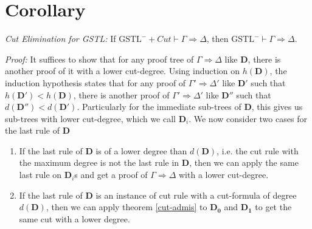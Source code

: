 \documentclass[a4paper, 12pt]{paper}
\begin{document}
\begin{itemize}
\begin{enumerate}[label=\Roman*]
\begin{itemize}
\begin{prooftree}
				\noLine
				
			\end{prooftree}
		\end{itemize}
	\end{enumerate}
\end{itemize}

\section{Corollary} \emph{Cut Elimination for GSTL: }
If $\text{GSTL}^- + Cut \vdash \Gamma \Rightarrow \Delta$, then $\text{GSTL}^- \vdash \Gamma \Rightarrow \Delta$.

\emph{Proof:} It suffices to show that for any proof tree of $\Gamma \Rightarrow \Delta$ like $\mathbf{D}$, there is another proof of it with a lower cut-degree. Using induction on $h(\mathbf{D})$, the induction hypothesis states that for any proof of $\Gamma' \Rightarrow \Delta'$ like $\mathbf{D'}$ such that $h(\mathbf{D'}) < h(\mathbf{D})$, there is another proof of $\Gamma' \Rightarrow \Delta'$ like $\mathbf{D''}$ such that $d(\mathbf{D''}) < d(\mathbf{D'})$. Particularly for the immediate sub-trees of $\mathbf{D}$, this gives us sub-trees with lower cut-degree, which we call $\mathbf{D}_i$. We now consider two cases for the last rule of $\mathbf{D}$

\begin{enumerate}[label=\Roman*]
	\item If the last rule of $\mathbf{D}$ is of a lower degree than $d(\mathbf{D})$, i.e. the cut rule with the maximum degree is not the last rule in $\mathbf{D}$, then we can apply the same last rule on $\mathbf{D}_i$s and get a proof of $\Gamma \Rightarrow \Delta$ with a lower cut-degree.
	
	\item If the last rule of $\mathbf{D}$ is an instance of cut rule with a cut-formula of degree $d(\mathbf{D})$, then we can apply theorem \ref{cut-admis} to $\mathbf{D_0}$ and $\mathbf{D_1}$ to get the same cut with a lower degree.
\end{enumerate}
\end{document}
